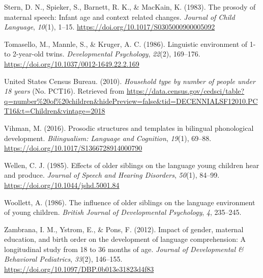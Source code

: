 \documentclass[
  english,
  man,floatsintext]{apa6}
\begin{document}
\leavevmode\hypertarget{ref-stern_prosody_1983}{}%
Stern, D. N., Spieker, S., Barnett, R. K., \& MacKain, K. (1983). The prosody of maternal speech: Infant age and context related changes. \emph{Journal of Child Language}, \emph{10}(1), 1--15. \url{https://doi.org/10.1017/S0305000900005092}

\leavevmode\hypertarget{ref-tomasello_linguistic_1986}{}%
Tomasello, M., Mannle, S., \& Kruger, A. C. (1986). Linguistic environment of 1- to 2-year-old twins. \emph{Developmental Psychology}, \emph{22}(2), 169--176. \url{https://doi.org/10.1037/0012-1649.22.2.169}

\leavevmode\hypertarget{ref-united_states_census_bureau_household_2010}{}%
United States Census Bureau. (2010). \emph{Household type by number of people under 18 years} (No. PCT16). Retrieved from \url{https://data.census.gov/cedsci/table?q=number\%20of\%20children\&hidePreview=false\&tid=DECENNIALSF12010.PCT16\&t=Children\&vintage=2018}

\leavevmode\hypertarget{ref-vihman_prosodic_2016}{}%
Vihman, M. (2016). Prosodic structures and templates in bilingual phonological development. \emph{Bilingualism: Language and Cognition}, \emph{19}(1), 69--88. \url{https://doi.org/10.1017/S1366728914000790}

\leavevmode\hypertarget{ref-wellen_effects_1985}{}%
Wellen, C. J. (1985). Effects of older siblings on the language young children hear and produce. \emph{Journal of Speech and Hearing Disorders}, \emph{50}(1), 84--99. \url{https://doi.org/10.1044/jshd.5001.84}

\leavevmode\hypertarget{ref-woollett_influence_1986}{}%
Woollett, A. (1986). The influence of older siblings on the language environment of young children. \emph{British Journal of Developmental Psychology}, \emph{4}, 235--245.

\leavevmode\hypertarget{ref-zambrana_impact_2012}{}%
Zambrana, I. M., Ystrom, E., \& Pons, F. (2012). Impact of gender, maternal education, and birth order on the development of language comprehension: A longitudinal study from 18 to 36 months of age. \emph{Journal of Developmental \& Behavioral Pediatrics}, \emph{33}(2), 146--155. \url{https://doi.org/10.1097/DBP.0b013e31823d4f83}

\endgroup
\end{document}
